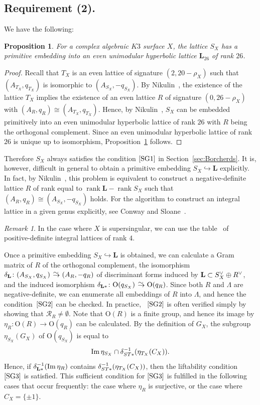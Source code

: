 \documentclass{amsart}
\theoremstyle{plain}
\newtheorem{proposition}[theorem]{Proposition}
\theoremstyle{definition}
\theoremstyle{remark}
\newtheorem{remark}[theorem]{Remark}
\numberwithin{equation}{section}
\numberwithin{table}{section}
\numberwithin{figure}{section}
\newcommand{\RRR}{\mathord{\mathcal R}}
\newcommand{\inj}{\hookrightarrow}
\newcommand{\isom}{\mathbin{\,\raise -.6pt\rlap{$\to$}\raise 3.5pt \hbox{\hskip .3pt$\mathord{\sim}$}\;}}
\newcommand{\inv}{\sp{-1}}
\newcommand{\dual}{\sp{\vee}}
\newcommand{\OG}{\mathord{\mathrm {O}}}
\newcommand{\Image}{\operatorname{\mathrm {Im}}\nolimits}
\newcommand{\rank}{\operatorname{\mathrm {rank}}\nolimits}
\renewcommand{\L}{\mathord{\mathbf{L}}}
\newcommand{\Roots}{\RRR}
\newcommand{\assumpone}{\mathord{\rm [SG1]}}
\newcommand{\assumptwo}{\mathord{\rm [SG2]}}
\newcommand{\assumpthree}{\mathord{\rm [SG3]}}
\begin{document}
\subsection{Requirement (2).}\label{subsec:req2}
%
We have the following:
%
\begin{proposition}\label{prop:embeddable}
For a complex algebraic $K3$ surface $X$,
the lattice $S_X$  has a primitive embedding into an even unimodular  hyperbolic lattice
$\L_{26}$
of rank $26$.
\end{proposition}
%
\begin{proof}
Recall that  $T_X$ is  an even lattice of signature $(2, 20-\rho_X)$
such that $(A_{T_X}, q_{T_X})$ is isomorphic to $(A_{S_X}, -q_{S_X})$.
By  Nikulin~\cite[Theorem~1.10.1]{MR525944},
the existence of the lattice $T_X$ implies 
the existence  of an even lattice $R$ of signature $(0, 26-\rho_X)$
with $(A_R, q_R)\cong (A_{T_X}, q_{T_X})$.
Hence,
by  Nikulin~\cite[Proposition~1.6.1]{MR525944},
$S_X$ can be embedded primitively into an even unimodular hyperbolic lattice 
of rank $26$ 
with $R$ being the orthogonal complement.
Since 
an even unimodular hyperbolic lattice 
of rank $26$ is unique up to isomorphism,
Proposition~\ref{prop:embeddable} follows.
\end{proof}
%
 Therefore $S_X$ always satisfies the condition
$\assumpone$ in Section~\ref{sec:Borcherds}.
It is, however,  difficult in general
to obtain  a primitive embedding $S_X\inj \L$ explicitly.
In fact, by Nikulin~\cite[Proposition~1.6.1]{MR525944},
this problem is equivalent to construct a negative-definite lattice $R$ of
rank equal to $\rank\L-\rank S_X$ such that
$(A_R, q_R)\cong (A_{S_X}, -q_{S_X})$ holds.
For the algorithm to construct an integral lattice in a given genus explicitly,
see Conway and Sloane~\cite[Chapter 15]{MR1662447}.
%
\begin{remark}
In the case where $X$ is supersingular,
we can use the table~\cite{MR1118842} of  positive-definite integral lattices of rank $4$.
\end{remark}
%
Once a primitive embedding $S_X\inj \L$ is obtained,
we can calculate a Gram matrix of $R$ of the orthogonal complement,
the isomorphism $\delta_{\L}\colon (A_{S_X}, q_{S_X})\isom (A_R, -q_R)$ of discriminant forms induced by $\L\subset S_X\dual\oplus R\dual$,
and the induced isomorphism $\delta_{\L*}\colon \OG(q_{S_X})\isom \OG(q_{R})$.
Since both $R$ and $\Lambda$ are negative-definite,
we can enumerate all embeddings of $R$ into $\Lambda$,
and hence the condition~$\assumptwo$ can be checked.
In practice, ~$\assumptwo$ is often verified simply by showing that $\Roots_{R}\ne \emptyset$.
Note that $\OG(R)$ is a finite group,
and hence its image  by $\eta_R\colon \OG(R)\to \OG(q_R)$ can be  calculated.
By the definition of $G_X$, the subgroup  $\eta_{S_X}(G_X)$ of $\OG(q_{S_X})$
is equal to
$$
\Image \eta_{S_X}\cap \delta_{ST*}\inv (\eta_{T_X}(C_X)).
$$
Hence, if $\delta_{\L*}\inv ( \Image \eta_{R})$ contains $\delta_{ST*}\inv (\eta_{T_X}(C_X))$,
then  the liftability condition~$\assumpthree$ is satisfied.
This sufficient condition for $\assumpthree$ is fulfilled
in the following cases that occur frequently:
the case where  $\eta_{R}$ is surjective,
or the case where $C_X=\{\pm 1\}$.
%
%
%
%
\end{document}
